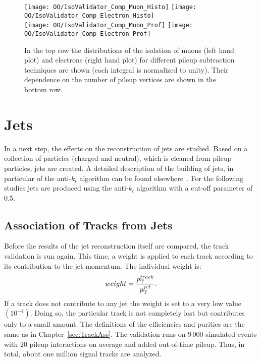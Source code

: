 \begin{figure}[Ht]
  \centering
  \texttt{[image: OO/IsoValidator\_Comp\_Muon\_Histo]}
  \texttt{[image: OO/IsoValidator\_Comp\_Electron\_Histo]}
  \\
  \texttt{[image: OO/IsoValidator\_Comp\_Muon\_Prof]}
  \texttt{[image: OO/IsoValidator\_Comp\_Electron\_Prof]}
  \caption[Distribution of the isolation of muons and electrons and their dependence on the number of pileup vertices for different pileup subtraction techniques]{In the top row the distributions of the isolation of muons (left hand plot) and electrons (right hand plot) for different pileup subtraction techniques are shown (each integral is normalized to unity). Their dependence on the number of pileup vertices are shown in the bottom row. \label{plot:OOIsoComp}}
\end{figure}

\section{Jets \label{sec:OOJets}}

In a next step, the effects on the reconstruction of jets are studied. Based on a collection of particles (charged and neutral), which is cleaned from pileup particles, jets are created. A detailed description of the building of jets, in particular of the anti-$k_{t}$ algorithm can be found elsewhere~\cite{Cacciari:2008gp}. For the following studies jets are produced using the anti-$k_{t}$ algorithm with a cut-off parameter of 0.5.

\subsection{Association of Tracks from Jets \label{sec:OOJetsTracks}}

Before the results of the jet reconstruction itself are compared, the track validation is run again. This time, a weight is applied to each track according to its contribution to the jet momentum. The individual weight is:
\begin{equation}
weight = \frac{ p_{\mathrm{T}}^{track} }{ p_{\mathrm{T}}^{jet} }.
\label{eq:OOJetWeight}
\end{equation}
If a track does not contribute to any jet the weight is set to a very low value $\left(10^{-4}\right)$. Doing so, the particular track is not completely lost but contributes only to a small amount. The definitions of the efficiencies and purities are the same as in Chapter~\ref{sec:TrackAss}. The validation runs on 9\,000 simulated \ttbar events with 20 pileup interactions on average and added out-of-time pileup. Thus, in total, about one million signal tracks are analyzed.

